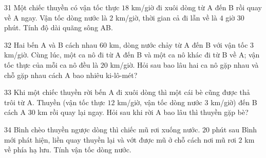 \begin{probbox}{31}{}
Một chiếc thuyền có vận tốc thực $18$ km/giờ đi xuôi dòng từ A đến B rồi quay về A ngay. Vận tốc dòng nước là $2$ km/giờ, thời gian cả đi lẫn về là $4$ giờ $30$ phút. Tính độ dài quãng sông AB.
\end{probbox}
\gap
\begin{probbox}{32}{}
Hai bến A và B cách nhau $60$ km, dòng nước chảy từ A đến B với vận tốc $3$ km/giờ. Cùng lúc, một ca nô đi từ A đến B và một ca nô khác đi từ B về A; vận tốc thực của mỗi ca nô đều là $20$ km/giờ. Hỏi sau bao lâu hai ca nô gặp nhau và chỗ gặp nhau cách A bao nhiêu ki-lô-mét?
\end{probbox}
\gap
\begin{probbox}{33}{}
Khi một chiếc thuyền rời bến A đi xuôi dòng thì một cái bè cũng được thả trôi từ A. Thuyền (vận tốc thực $12$ km/giờ, vận tốc dòng nước $3$ km/giờ) đến B cách A $30$ km rồi quay lại ngay. Hỏi sau khi rời A bao lâu thì thuyền gặp bè?
\end{probbox}
\gap
\begin{probbox}{34}{}
Bình chèo thuyền ngược dòng thì chiếc mũ rơi xuống nước. $20$ phút sau Bình mới phát hiện, liền quay thuyền lại và vớt được mũ ở chỗ cách nơi mũ rơi $2$ km về phía hạ lưu. Tính vận tốc dòng nước.
\end{probbox}
